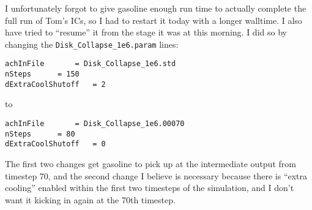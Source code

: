 \documentclass[11pt,letterpaper]{article}
\begin{document}
I unfortunately forgot to give gasoline enough run time to actually
complete the full run of Tom's ICs, so I had to restart it today with a
longer walltime. I also have tried to ``resume'' it from the stage it
was at this morning. I did so by changing the
\verb!Disk_Collapse_1e6.param! lines:

\begin{verbatim}
achInFile       = Disk_Collapse_1e6.std
nSteps      = 150
dExtraCoolShutoff   = 2
\end{verbatim}

to

\begin{verbatim}
achInFile       = Disk_Collapse_1e6.00070
nSteps      = 80
dExtraCoolShutoff   = 0
\end{verbatim}

The first two changes get gasoline to pick up at the intermediate output
from timestep 70, and the second change I believe is necessary because
there is ``extra cooling'' enabled within the first two timesteps of the
simulation, and I don't want it kicking in again at the 70th timestep.
\end{document}
